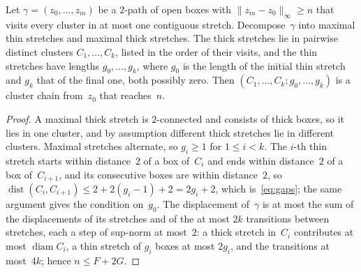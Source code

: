 \documentclass[11pt,letterpaper]{article}
\DeclareMathOperator{\diam}{diam}
\DeclareMathOperator{\dist}{dist}
\begin{document}
\begin{lemma}
\label{lem:skeleton}
Let $\gamma=(z_0,\dots,z_m)$ be a $2$-path of open boxes with $\lVert z_m-z_0\rVert_\infty\ge n$ that visits every cluster in at most one contiguous stretch. Decompose~$\gamma$ into maximal thin stretches and maximal thick stretches. The thick stretches lie in pairwise distinct clusters $C_1,\dots,C_k$, listed in the order of their visits, and the thin stretches have lengths $g_0,\dots,g_k$, where $g_0$ is the length of the initial thin stretch and $g_k$ that of the final one, both possibly zero. Then $(C_1,\dots,C_k;g_0,\dots,g_k)$ is a cluster chain from~$z_0$ that reaches~$n$.
\end{lemma}

\begin{proof}
A maximal thick stretch is $2$-connected and consists of thick boxes, so it lies in one cluster, and by assumption different thick stretches lie in different clusters. Maximal stretches alternate, so $g_i\ge1$ for $1\le i<k$. The $i$-th thin stretch starts within distance~$2$ of a box of~$C_i$ and ends within distance~$2$ of a box of~$C_{i+1}$, and its consecutive boxes are within distance~$2$, so $\dist(C_i,C_{i+1})\le2+2(g_i-1)+2=2g_i+2$, which is~\eqref{eq:gaps}; the same argument gives the condition on~$g_0$. The displacement of~$\gamma$ is at most the sum of the displacements of its stretches and of the at most $2k$ transitions between stretches, each a step of sup-norm at most~$2$: a thick stretch in~$C_i$ contributes at most $\diam C_i$, a thin stretch of $g_i$ boxes at most $2g_i$, and the transitions at most~$4k$; hence $n\le F+2G$.
\end{proof}
\end{document}
